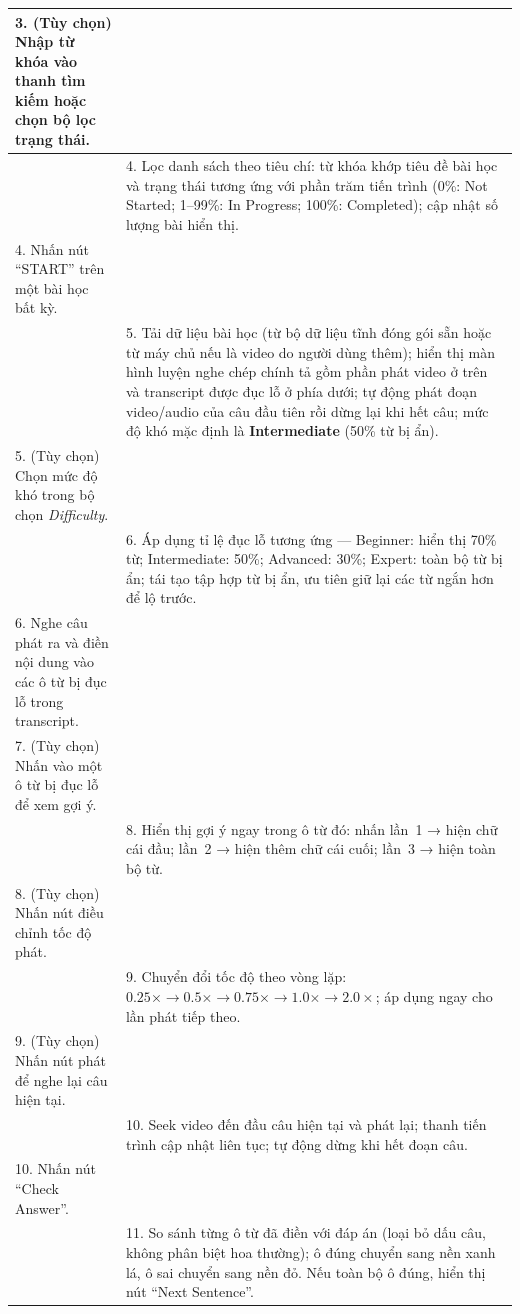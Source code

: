 \begin{longtable}{|p{\tbu}|p{\tbu}|}
    3. (Tùy chọn) Nhập từ khóa vào thanh tìm kiếm hoặc chọn bộ lọc trạng thái. & \\ \hline
    & 4. Lọc danh sách theo tiêu chí: từ khóa khớp tiêu đề bài học và trạng thái tương ứng với phần trăm tiến trình (0\%: Not Started; 1--99\%: In Progress; 100\%: Completed); cập nhật số lượng bài hiển thị. \\ \hline
    4. Nhấn nút ``START'' trên một bài học bất kỳ. & \\ \hline
    & 5. Tải dữ liệu bài học (từ bộ dữ liệu tĩnh đóng gói sẵn hoặc từ máy chủ nếu là video do người dùng thêm); hiển thị màn hình luyện nghe chép chính tả gồm phần phát video ở trên và transcript được đục lỗ ở phía dưới; tự động phát đoạn video/audio của câu đầu tiên rồi dừng lại khi hết câu; mức độ khó mặc định là \textbf{Intermediate} (50\% từ bị ẩn). \\ \hline
    5. (Tùy chọn) Chọn mức độ khó trong bộ chọn \textit{Difficulty}. & \\ \hline
    & 6. Áp dụng tỉ lệ đục lỗ tương ứng --- Beginner: hiển thị 70\% từ; Intermediate: 50\%; Advanced: 30\%; Expert: toàn bộ từ bị ẩn; tái tạo tập hợp từ bị ẩn, ưu tiên giữ lại các từ ngắn hơn để lộ trước. \\ \hline
    6. Nghe câu phát ra và điền nội dung vào các ô từ bị đục lỗ trong transcript. & \\ \hline
    7. (Tùy chọn) Nhấn vào một ô từ bị đục lỗ để xem gợi ý. & \\ \hline
    & 8. Hiển thị gợi ý ngay trong ô từ đó: nhấn lần~1 → hiện chữ cái đầu; lần~2 → hiện thêm chữ cái cuối; lần~3 → hiện toàn bộ từ. \\ \hline
    8. (Tùy chọn) Nhấn nút điều chỉnh tốc độ phát. & \\ \hline
    & 9. Chuyển đổi tốc độ theo vòng lặp: $0.25\times \to 0.5\times \to 0.75\times \to 1.0\times \to 2.0\times$; áp dụng ngay cho lần phát tiếp theo. \\ \hline
    9. (Tùy chọn) Nhấn nút phát để nghe lại câu hiện tại. & \\ \hline
    & 10. Seek video đến đầu câu hiện tại và phát lại; thanh tiến trình cập nhật liên tục; tự động dừng khi hết đoạn câu. \\ \hline
    10. Nhấn nút ``Check Answer''. & \\ \hline
    & 11. So sánh từng ô từ đã điền với đáp án (loại bỏ dấu câu, không phân biệt hoa thường); ô đúng chuyển sang nền xanh lá, ô sai chuyển sang nền đỏ. Nếu toàn bộ ô đúng, hiển thị nút ``Next Sentence''. \\ \hline

\end{longtable}
